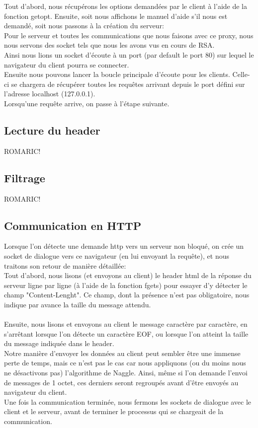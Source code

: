 \documentclass{scrreprt}
\begin{document}
Tout d'abord, nous récupérons les options demandées par le client à l'aide de la fonction getopt. Ensuite, soit nous affichons le manuel d'aide s'il nous est demandé, soit nous passons à la création du serveur:\\
Pour le serveur et toutes les communications que nous faisons avec ce proxy, nous nous servons des socket tels que nous les avons vus en cours de RSA.\\
Ainsi nous lions un socket d'écoute à un port (par default le port 80) sur lequel le navigateur du client pourra se connecter.\\
Ensuite nous pouvons lancer la boucle principale d'écoute pour les clients. Celle-ci se chargera de récupérer toutes les requêtes arrivant depuis le port défini sur l'adresse localhost (127.0.0.1).\\
Lorsqu'une requête arrive, on passe à l'étape suivante.
\subsection{Lecture du header}
ROMARIC!
\subsection{Filtrage}
ROMARIC!
\subsection{Communication en HTTP}

Lorsque l'on détecte une demande http vers un serveur non bloqué, on crée un socket de dialogue vers ce navigateur (en lui envoyant la requête), et nous traitons son retour de manière détaillée:\\
Tout d'abord, nous lisons (et envoyons au client) le header html de la réponse du serveur ligne par ligne (à l'aide de la fonction fgets) pour essayer d'y détecter le champ "Content-Lenght". Ce champ, dont la présence n'est pas obligatoire, nous indique par avance la taille du message attendu.\\\\
Ensuite, nous lisons et envoyons au client le message caractère par caractère, en s'arrêtant lorsque l'on détecte un caractère EOF, ou lorsque l'on atteint la taille du message indiquée dans le header.\\
Notre manière d'envoyer les données au client peut sembler être une immense perte de temps, mais ce n'est pas le cas car nous appliquons (ou du moins nous ne désactivons pas) l'algorithme de Naggle. Ainsi, même si l'on demande l'envoi de messages de 1 octet, ces derniers seront regroupés avant d'être envoyés au navigateur du client.\\
Une fois la communication terminée, nous fermons les sockets de dialogue avec le client et le serveur, avant de terminer le processus qui se chargeait de la communication.
\end{document}

